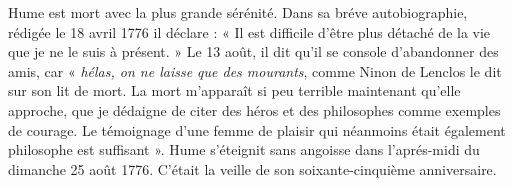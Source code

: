 Hume est mort avec la plus grande sérénité.
Dans sa bréve autobiographie, rédigée le 18 avril 1776
il déclare : « Il est difficile d’être plus détaché de la
vie que je ne le suis à présent. » Le 13 août, il dit qu'il
se console d’abandonner des amis, car « {\it hélas, on
ne laisse que des mourants}, comme Ninon de Lenclos
le dit sur son lit de mort. La mort m'apparaît si
peu terrible maintenant qu’elle approche, que je
dédaigne de citer des héros et des philosophes comme
exemples de courage. Le témoignage d’une femme de
plaisir qui néanmoins était également philosophe
est suffisant ». Hume s’éteignit sans angoisse dans
l'aprés-midi du dimanche 25 août 1776. C’était la
veille de son soixante-cinquième anniversaire.
